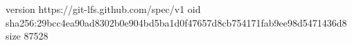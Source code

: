 version https://git-lfs.github.com/spec/v1
oid sha256:29bcc4ea90ad8302b0e904bd5ba1d0f47657d8cb754171fab9ee98d5471436d8
size 87528
